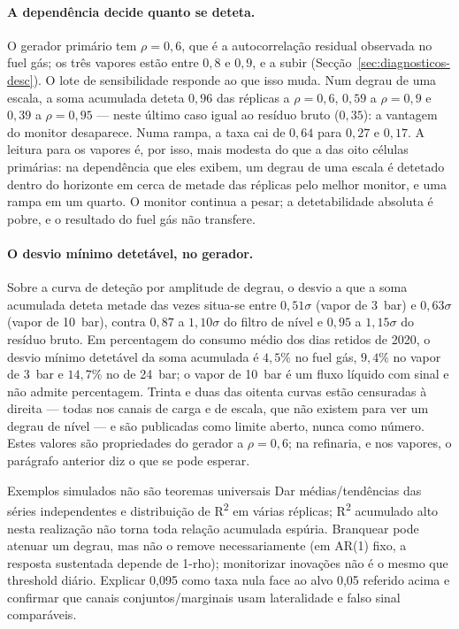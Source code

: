 \paragraph{A dependência decide quanto se deteta.} O gerador primário tem
$\rho = 0{,}6$, que é a autocorrelação residual observada no fuel gás; os
três vapores estão entre $0{,}8$ e $0{,}9$, e a subir
(Secção~\ref{sec:diagnosticos-desc}). O lote de sensibilidade responde ao que
isso muda. Num degrau de uma escala, a soma acumulada deteta $0{,}96$ das
réplicas a $\rho = 0{,}6$, $0{,}59$ a $\rho = 0{,}9$ e $0{,}39$ a
$\rho = 0{,}95$ --- neste último caso igual ao resíduo bruto ($0{,}35$): a
vantagem do monitor desaparece. Numa rampa, a taxa cai de $0{,}64$ para
$0{,}27$ e $0{,}17$. A leitura para os vapores é, por isso, mais modesta do
que a das oito células primárias: na dependência que eles exibem, um degrau
de uma escala é detetado dentro do horizonte em cerca de metade das
réplicas pelo melhor monitor, e uma rampa em um quarto. O monitor continua
a pesar; a detetabilidade absoluta é pobre, e o resultado do fuel gás não
transfere.

\paragraph{O desvio mínimo detetável, no gerador.} Sobre a curva de deteção
por amplitude de degrau, o desvio a que a soma acumulada deteta metade das
vezes situa-se entre $0{,}51\sigma$ (vapor de 3~bar) e $0{,}63\sigma$ (vapor
de 10~bar), contra $0{,}87$ a $1{,}10\sigma$ do filtro de nível e $0{,}95$ a
$1{,}15\sigma$ do resíduo bruto. Em percentagem do consumo médio dos dias
retidos de 2020, o desvio mínimo detetável da soma acumulada é $4{,}5\%$ no
fuel gás, $9{,}4\%$ no vapor de 3~bar e $14{,}7\%$ no de 24~bar; o vapor de
10~bar é um fluxo líquido com sinal e não admite percentagem. Trinta e duas
das oitenta curvas estão censuradas à direita --- todas nos canais de carga e
de escala, que não existem para ver um degrau de nível --- e são publicadas
como limite aberto, nunca como número. Estes valores são propriedades do
gerador a $\rho = 0{,}6$; na refinaria, e nos vapores, o parágrafo anterior
diz o que se pode esperar.

{Exemplos simulados não são teoremas universais}
{Dar médias/tendências das séries independentes e distribuição de R\textsuperscript{2}
em várias réplicas; R\textsuperscript{2} acumulado alto nesta realização não torna toda
relação acumulada espúria. Branquear pode atenuar um degrau, mas não o
remove necessariamente (em AR(1) fixo, a resposta sustentada depende
de 1-rho); monitorizar inovações não é o mesmo que threshold diário.
Explicar 0,095 como taxa nula face ao alvo 0,05 referido acima e confirmar
que canais conjuntos/marginais usam lateralidade e falso sinal comparáveis.}%
